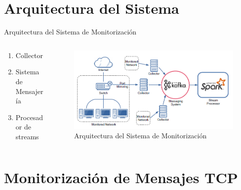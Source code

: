 \documentclass[aspectratio=149]{beamer}
\begin{document}
\section{Arquitectura del Sistema}
\begin{frame}[label=arquitectura]{Arquitectura del Sistema de Monitorización}
    \begin{columns}
    \begin{column}{0.4\textwidth}
        \begin{enumerate}
            \item Collector
            \item Sistema de Mensajería
            \item Procesador de streams
        \end{enumerate}
    \end{column}
    \begin{column}{0.7\textwidth}
        \begin{figure}
            \centering
            \includegraphics[width=1.0\textwidth]{img/arquitectura.png}
            \caption{Arquitectura del Sistema de Monitorización}
            \label{fig:arch}
        \end{figure}
    \end{column}
    \end{columns}
\end{frame}

\section{Monitorización de Mensajes TCP}
\end{document}
